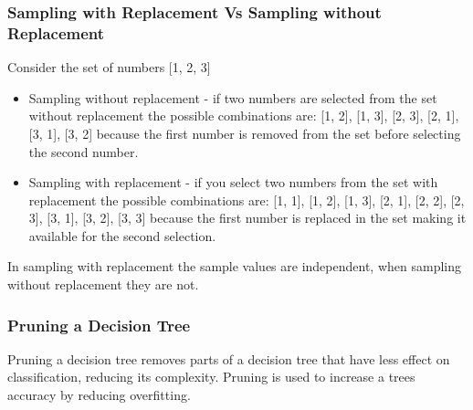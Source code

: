 		\subsubsection{Sampling with Replacement Vs Sampling without Replacement}
		Consider the set of numbers [1, 2, 3]
		
		\begin{itemize}
			\item Sampling without replacement - if two numbers are selected from the set without replacement the possible combinations are: [1, 2], [1, 3], [2, 3], [2, 1], [3, 1], [3, 2] because the first number is removed from the set before selecting the second number.
			\item Sampling with replacement - if you select two numbers from the set with replacement the possible combinations are: [1, 1], [1, 2], [1, 3], [2, 1], [2, 2], [2, 3], [3, 1], [3, 2], [3, 3] because the first number is replaced in the set making it available for the second selection.
		\end{itemize}
		
		In sampling with replacement the sample values are independent, when sampling without replacement they are not.
				
		\subsubsection{Pruning a Decision Tree}
		Pruning a decision tree removes parts of a decision tree that have less effect on classification, reducing its complexity. Pruning is used to increase a trees accuracy by reducing overfitting.